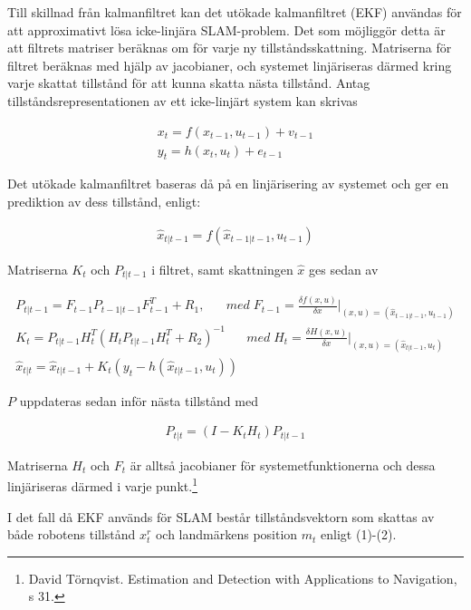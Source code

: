 \documentclass[a4paper,12pt,fleqn]{article}
\begin{document}
Till skillnad från kalmanfiltret kan det utökade kalmanfiltret (EKF) användas för att approximativt lösa icke-linjära SLAM-problem. Det som möjliggör detta är att filtrets matriser beräknas om för varje ny tillståndsskattning. Matriserna för filtret beräknas med hjälp av jacobianer, och systemet linjäriseras därmed kring varje skattat tillstånd för att kunna skatta nästa tillstånd. Antag tillståndsrepresentationen av ett icke-linjärt system kan skrivas

\begin{gather}
	x_{t} = f(x_{t-1}, u_{t-1}) + v_{t-1} \\
	y_{t} = h(x_{t},u_{t}) + e_{t-1}
\end{gather}

Det utökade kalmanfiltret baseras då på en linjärisering av systemet och ger en prediktion av dess tillstånd, enligt:

\begin{gather}
	\hat{x}_{t|t-1} = f(\hat{x}_{t-1|t-1}, u_{t-1})
\end{gather}

Matriserna $K_t$ och $P_{t|t-1}$ i filtret, samt skattningen $\hat{x}$ ges sedan av

\begin{gather}
	P_{t|t-1} = F_{t-1}P_{t-1|t-1}F^T_{t-1}+R_{1},\;\;\;\;\;\; med \; F_{t-1} = \frac{\delta f(x,u)}{\delta x}\big|_{(x,u) = (\hat{x}_{t-1|t-1}, u_{t-1})} \\
	K_{t} = P_{t|t-1}H_{t}^T(H_{t}P_{t|t-1}H_{t}^T+R_{2})^{-1}\;\;\;\;\;\; med \; H_{t} = \frac{\delta H(x,u)}{\delta x}\big|_{(x,u) = (\hat{x}_{t|t-1}, u_{t})} \\
	\hat{x}_{t|t} = \hat{x}_{t|t-1}+K_{t}(y_{t}-h(\hat{x}_{t|t-1},u_{t}))
\end{gather}

$P$ uppdateras sedan inför nästa tillstånd med

\begin{gather}
	P_{t|t} = (I-K_{t}H_{t})P_{t|t-1}
\end{gather}

Matriserna $H_t$ och $F_t$ är alltså jacobianer för systemetfunktionerna och dessa linjäriseras därmed i varje punkt.\footnote{David Törnqvist. Estimation and Detection with Applications to Navigation, s 31.}

I det fall då EKF används för SLAM består tillståndsvektorn som skattas av både robotens tillstånd $x^r_t$ och landmärkens position $m_t$ enligt (1)-(2).

\newpage
\end{document}
